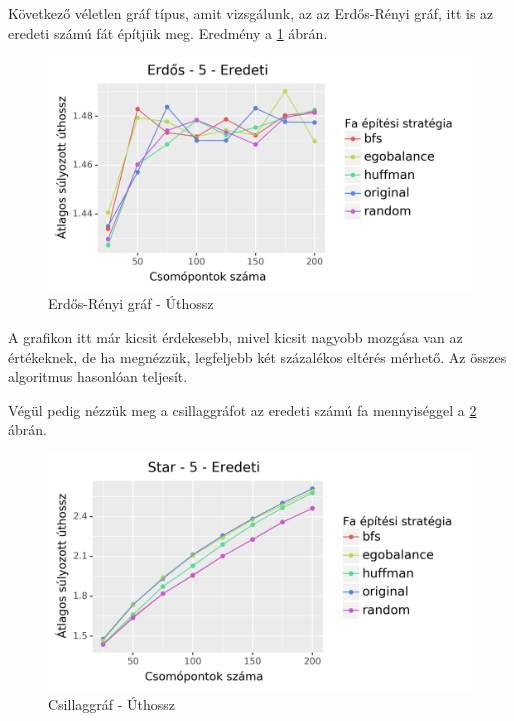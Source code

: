 \documentclass[12pt]{report}
\begin{document}
Következő véletlen gráf típus, amit vizsgálunk, az az Erdős-Rényi gráf, itt is az eredeti számú fát építjük meg.
Eredmény a \ref{erdos-len} ábrán.

\begin{figure}[H]
	\begin{center}
		\includegraphics[width=0.9\linewidth]{pictures/erdos_len_e.png}
		\caption{Erdős-Rényi gráf - Úthossz}
		\label{erdos-len}
	\end{center}
\end{figure}

A grafikon itt már kicsit érdekesebb, mivel kicsit nagyobb mozgása van az értékeknek, de ha megnézzük, legfeljebb két százalékos eltérés mérhető.
Az összes algoritmus hasonlóan teljesít.   

Végül pedig nézzük meg a csillaggráfot az eredeti számú fa mennyiséggel a \ref{star-len} ábrán.

\begin{figure}[H]
	\begin{center}
		\includegraphics[width=0.9\linewidth]{pictures/star_len_e.png}
		\caption{Csillaggráf - Úthossz}
		\label{star-len}
	\end{center}
\end{figure}
\end{document}

